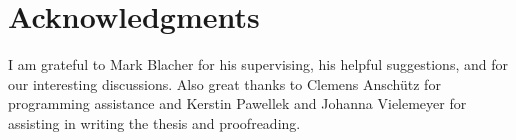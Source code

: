 \documentclass[crop=false]{standalone}
\begin{document}


  \section*{Acknowledgments}
  \thispagestyle{empty}
  I am grateful to Mark Blacher for his supervising, his helpful suggestions, and for our interesting discussions.
  Also great thanks to Clemens Anschütz for programming assistance and Kerstin Pawellek and Johanna Vielemeyer for assisting in writing the thesis and proofreading.
  \restoregeometry
\end{document}

